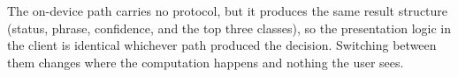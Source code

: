 \noindent The on-device path carries no protocol, but it produces the same result structure (status, phrase, confidence, and the top three classes), so the presentation logic in the client is identical whichever path produced the decision. Switching between them changes where the computation happens and nothing the user sees.
